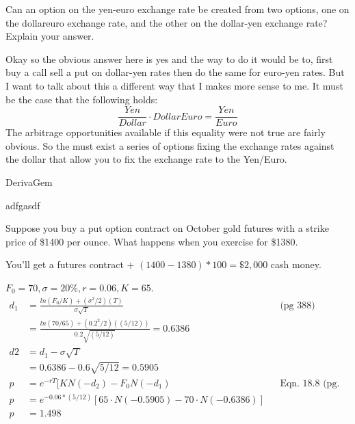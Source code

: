 \documentclass[12pt]{article}
\newenvironment{problem}[3][Problem]{\begin{trivlist}
\item[\hskip \labelsep {\bfseries #1}\hskip \labelsep {\bfseries #2.}]}{\end{trivlist}}
\begin{document}
\begin{problem}{17.22}. Can an option on the yen-euro exchange rate be created from two options, one on the dollareuro exchange rate, and the other on the dollar-yen exchange rate? Explain your answer.

Okay so the obvious answer here is yes and the way to do it would be to, first buy a call sell a put on dollar-yen rates then do the same for euro-yen rates. But I want to talk about this a different way that I makes more sense to me. It must be the case that the following holds: $$\frac{Yen}{Dollar}\cdot {Dollar}{Euro}= \frac{Yen}{Euro}$$
The arbitrage opportunities available if this equality were not true are fairly obvious. So the must exist a series of options fixing the exchange rates against the dollar that allow you to fix the exchange rate to the Yen/Euro. 

\end{problem}
\begin{problem}{17.23}. DerivaGem
\end{problem}


\begin{problem}{18.7}. adfgasdf
\end{problem}

\begin{problem}{18.8}. Suppose you buy a put option contract on October gold futures with a strike price of \$1400 per ounce. What happens when you exercise for \$1380. 

You\rq{}ll get a futures contract + $(1400-1380)*100 = \$2,000$ cash money. 
\end{problem}

\begin{problem}{18.15}. $F_0= 70, \sigma = 20\% , r= 0.06, K=65$. 
\begin{align*}
d_1 &= \frac{ln(F_0/K) + (\sigma^2/2)(T)}{\sigma \sqrt{T}}  && \text{(pg 388)} \\
&= \frac{ln(70/65) + (0.2^2/2)((5/12))}{0.2 \sqrt{(5/12)}} = 0.6386 \\
d2 &= d_1 - \sigma \sqrt{T}  \\
&= 0.6386 - 0.6\sqrt{5/12} = 0.5905 \\
p &= e^{-rT}[KN(-d_2) - F_0N(-d_1) && \text{Eqn. 18.8 (pg. 388)} \\
p &= e^{-0.06*(5/12)}[65\cdot N(-0.5905) -  70 \cdot N(-0.6386)] \\
p &= 1.498 
\end{align*}
\end{problem}
\end{document}
